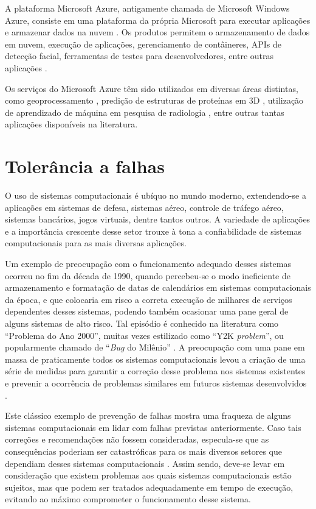 \documentclass[
	12pt,				%
	openright,			%
	twoside,			%
	a4paper,			%
	english,			%
	french,				%
	spanish,			%
	brazil				%
	]{abntex2}
\begin{document}
A plataforma Microsoft Azure, antigamente chamada de Microsoft Windows Azure, consiste em uma plataforma da própria Microsoft para executar aplicações e armazenar dados na nuvem \cite{chappell2009introducing}. Os produtos permitem o armazenamento de dados em nuvem, execução de aplicações, gerenciamento de contâineres, APIs de detecção facial, ferramentas de testes para desenvolvedores, entre outras aplicações \cite{microsoftazure}.

Os serviços do Microsoft Azure têm sido utilizados em diversas áreas distintas, como geoprocessamento \cite{gong2010geoprocessing}, predição de estruturas de proteínas em 3D \cite{mrozek2015scaling}, utilização de aprendizado de máquina em pesquisa de radiologia \cite{kohli2017implementing}, entre outras tantas aplicações disponíveis na literatura.

\section{Tolerância a falhas}

O uso de sistemas computacionais é ubíquo no mundo moderno, extendendo-se a aplicações em sistemas de defesa, sistemas aéreo, controle de tráfego aéreo, sistemas bancários, jogos virtuais, dentre tantos outros. A variedade de aplicações e a importância crescente desse setor trouxe à tona a confiabilidade de sistemas computacionais para as mais diversas aplicações. \cite{andersonfault}

Um exemplo de preocupação com o funcionamento adequado desses sistemas ocorreu no fim da década de 1990, quando percebeu-se o modo ineficiente de armazenamento e formatação de datas de calendários em sistemas computacionais da época, e que colocaria em risco a correta execução de milhares de serviços dependentes desses sistemas, podendo também ocasionar uma pane geral de alguns sistemas de alto risco. Tal episódio é conhecido na literatura como ``Problema do Ano 2000'', muitas vezes estilizado como ``Y2K \emph{problem}'', ou popularmente chamado de ``\emph{Bug} do Milênio'' . A preocupação com uma pane em massa de praticamente todos os sistemas computacionais levou a criação de uma série de medidas para garantir a correção desse problema nos sistemas existentes e prevenir a ocorrência de problemas similares em futuros sistemas desenvolvidos \cite{petersen1998y2k}.

Este clássico exemplo de prevenção de falhas mostra uma fraqueza de alguns sistemas computacionais em lidar com falhas previstas anteriormente. Caso tais correções e recomendações não fossem consideradas, especula-se que as consequências poderiam ser catastróficas para os mais diversos setores que dependiam desses sistemas computacionais \cite{smith1997year}. Assim sendo, deve-se levar em consideração que existem problemas aos quais sistemas computacionais estão sujeitos, mas que podem ser tratados adequadamente em tempo de execução, evitando ao máximo comprometer o funcionamento desse sistema.
\end{document}
